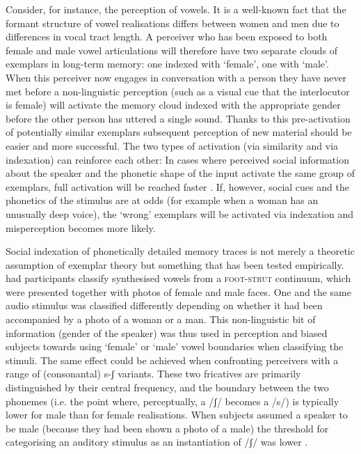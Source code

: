 Consider, for instance, the perception of vowels.
It is a well-known fact that the formant structure of vowel realisations differs between women and men due to differences in vocal tract length.
A perceiver who has been exposed to both female and male vowel articulations will therefore have two separate clouds of exemplars in long-term memory: one indexed with `female', one with `male'.
When this perceiver now engages in conversation with a person they have never met before a non-linguistic perception (such as a visual cue that the interlocutor is female) will activate the memory cloud indexed with the appropriate gender before the other person has uttered a single sound.
Thanks to this pre-activation of potentially similar exemplars subsequent perception of new material should be easier and more successful.
The two types of activation (via similarity and via indexation) can reinforce each other: In cases where perceived social information about the speaker and the phonetic shape of the input activate the same group of exemplars, full activation will be reached faster \parencite[cf.][370--371]{hayetal2006a}.
If, however, social cues and the phonetics of the stimulus are at odds (for example when a woman has an unusually deep voice), the `wrong' exemplars will be activated via indexation and misperception becomes more likely.

Social indexation of phonetically detailed memory traces is not merely a theoretic assumption of exemplar theory but something that has been tested empirically.
\textcite{strandjohnson1996} had participants classify synthesised vowels from a \textsc{foot}-\textsc{strut} continuum, which were presented together with photos of female and male faces.
One and the same audio stimulus was classified differently depending on whether it had been accompanied by a photo of a woman or a man.
This non-linguistic bit of information (gender of the speaker) was thus used in perception and biased subjects towards using `female' or `male' vowel boundaries when classifying the stimuli.
The same effect could be achieved when confronting perceivers with a range of (consonantal) s-ʃ variants.
These two fricatives are primarily distinguished by their central frequency, and the boundary between the two phonemes (i.e. the point where, perceptually, a /ʃ/ becomes a /s/) is typically lower for male than for female realisations.
When subjects assumed a speaker to be male (because they had been shown a photo of a male) the threshold for categorising an auditory stimulus as an instantiation of /ʃ/ was lower \parencite[cf.][]{strandjohnson1996,strand1999}.

